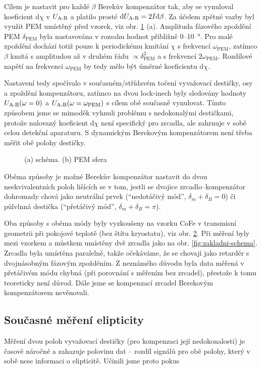 Cílem je nastavit pro každé $\beta$ Berekův kompenzátor tak, aby se vynuloval koeficient $\textrm{d}\chi$ v $U_\textrm{A-B}$ a platilo prosté $\textrm{d}U_\textrm{A-B}=2I\textrm{d}\beta$.
Za účelem zpětné vazby byl využit PEM umístěný před vzorek, viz obr. \ref{fig:dynamicky-berek} (a).
Amplituda fázového zpoždění PEM $\delta_\textrm{PEM}$ byla nastavována v rozsahu hodnot přibližně 0--\SI{10}{\degree}.
Pro malé zpoždění dochází totiž pouze k periodickému kmitání $\chi$ s frekvencí $\omega_\textrm{PEM}$, zatímco $\beta$ kmitá s amplitudou až v druhém řádu $\propto\delta_\textrm{PEM}^2$ a s frekvencí $2\omega_\textrm{PEM}$.
Rozdílové napětí na frekvenci $\omega_\textrm{PEM}$ by tedy mělo být úměrné koeficientu $\textrm{d}\chi$.

Nastavení tedy spočívalo v současném/střídavém točení vyvažovací destičky, osy a zpoždění kompenzátoru, zatímco na dvou lock-inech byly sledovány hodnoty $U_\textrm{A-B}(\omega=0)$ a $U_\textrm{A-B}(\omega=\omega_\textrm{PEM})$ s cílem obě současně vynulovat.
Tímto způsobem jsme se mimoděk vyhnuli problému s nedokonalými destičkami, protože nulovaný koeficient $\textrm{d}\chi$ není specifický pro zrcadla, ale zahrnuje v sobě celou detekční aparaturu.
S dynamickým Berekovým kompenzátorem není třeba měřit obě polohy destičky.


\begin{figure}[htbp]
    \centering
    \missingfigure{}
    \caption{(a) schéma. (b) PEM sfera}
    \label{fig:dynamicky-berek}
\end{figure}

Oběma způsoby je možné Berekův kompenzátor nastavit do dvou neekvivalentních poloh lišících se v tom, jestli se dvojice zrcadlo--kompenzátor dohromady chová jako neutrální prvek (``nedotáčivý mód'', $\delta_m+\delta_B=0$) či půlvlnná destička (``přetáčivý mód'', $\delta_m+\delta_B=\pi$).

Oba způsoby s oběma módy byly vyzkoušeny na vzorku CoFe v transmisní geometrii při pokojové teplotě (bez štítu kryostatu), viz obr. \ref{fig:g:mustek-kompenzace-berek-vysledky}.
Při měření byly mezi vzorkem a můstkem umístěny dvě zrcadla jako na obr. \ref{fig:zakladni-schema}.
Zrcadla byla umístěna paralelně, takže očekáváme, že se chovají jako retardér s dvojnásobným fázovým zpožděním.
Z neznámého důvodu byla data měřená v přetáčivém módu chybná (při porovnání s měřením bez zrcadel), přestože k tomu teoreticky není důvod.
Dále jsme se kompenzací zrcadel Berekovým kompenzátorem nevěnovali.

\begin{figure}[htbp]
    \centering
    \missingfigure{}
    \caption{}
    \label{fig:g:mustek-kompenzace-berek-vysledky}
\end{figure}

\subsection{Současné měření elipticity}
\label{chap:elipticita}

Měření dvou poloh vyvažovací destičky (pro kompenzaci její nedokonalosti) je časově náročné a zahazuje polovinu dat -- rozdíl signálů pro obě polohy, který v sobě nese informaci o elipticitě.
Učinili jsme proto pokus 
